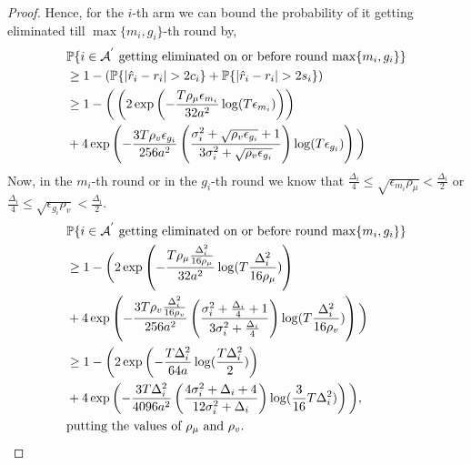 \begin{proof}
Hence, for the $i$-th arm we can bound the probability of it getting eliminated till $\max\lbrace m_i , g_i  \rbrace$-th round by,
\begin{align*}
 & \mathbb{P}\lbrace \text{$i\in \mathcal{A}^{'}$ getting eliminated on or before round $\max\lbrace m_i, g_i\rbrace$} \rbrace \\
&\geq 1-(\mathbb{P}\lbrace |\hat{r}_i -r_i| > 2c_i \rbrace + \mathbb{P}\lbrace |\hat{r}_i -r_i| > 2s_i \rbrace)\\
&\geq 1- \bigg( \left(2\exp\left(-\frac{T\rho_{\mu}\epsilon_{m_{i}}}{32 a^2}\log ( T\epsilon_{m_{i}})\right)\right)\\
& + 4\exp\left(- \frac{3T\rho_v\epsilon_{g_{i}}}{256 a^2 } \left(\frac{\sigma_{i}^{2}+\sqrt{\rho_{v}\epsilon_{g_{i}}}+1}{3\sigma_{i}^{2}+\sqrt{\rho_v \epsilon_{g_{i}}}}\right) \log( T\epsilon_{g_{i}}) \right)\bigg)
\end{align*}
Now, in the $m_i$-th round or in the $g_i$-th round we know that $\frac{\Delta_i}{4}\leq\sqrt{\epsilon_{m_{i}}\rho_{\mu}}<\frac{\Delta_i}{2}$ or  $\frac{\Delta_i}{4}\leq\sqrt{\epsilon_{g_{i}}\rho_{v}}<\frac{\Delta_i}{2}$.
\begin{align*}
&\mathbb{P}\lbrace \text{$i\in \mathcal{A}^{'}$ getting eliminated on or before round $\max\lbrace m_i, g_i\rbrace$} \rbrace\\
& \geq 1- \bigg( 2\exp\left(-\frac{T\rho_{\mu}\frac{\Delta_{i}^{2}}{16\rho_{\mu}}}{32 a^2 }\log ( T\frac{\Delta_{i}^{2}}{16\rho_{\mu}})\right)\\
& + 4\exp\left(- \frac{3T\rho_v\frac{\Delta_{i}^{2}}{16\rho_{v}}}{256 a^2} \left(\frac{\sigma_{i}^{2}+\frac{\Delta_{i}}{4}+1}{3\sigma_{i}^{2}+\frac{\Delta_{i}}{4}}\right) \log( T\frac{\Delta_{i}^{2}}{16\rho_{v}}) \right)\bigg)\\
&\geq 1-\bigg( 2\exp\left(-\frac{T\Delta_{i}^{2}}{64a}\log( \frac{T\Delta_{i}^{2}}{2})\right) \\
& + 4\exp\left(- \frac{3T\Delta_{i}^{2}}{4096 a^2} \left(\frac{4\sigma_{i}^{2}+\Delta_{i}+4}{12\sigma_{i}^{2}+\Delta_{i}}\right) \log( \frac{3}{16} T\Delta_{i}^{2}) \right)\bigg),\\
&\text{putting the values of $\rho_{\mu}$ and $\rho_{v}$.}
\end{align*}

\end{proof}
